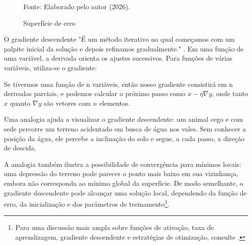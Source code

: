 \begin{figure}[htb]
	\centering
	\captionsetup{justification=centering}
	\caption{Superfície de erro}
	\label{fig:superficie_erro}
	\vspace{5pt}
	
	

	\vspace{0.2cm}
	\footnotesize Fonte: Elaborado pelo autor (2026).
	
\end{figure}

O gradiente descendente "É um método iterativo no qual começamos com um palpite inicial da solução e depois refinamos gradualmente." . Em uma função de uma variável, a derivada orienta os ajustes sucessivos. Para funções de várias variáveis, utiliza-se o gradiente:

\begin{citacao}
	Se tivermos uma função de n variáveis, então nosso gradiente consistirá em n derivadas parciais, e podemos calcular o próximo passo como $x-\eta \nabla y$, onde tanto $x$ quanto $\nabla y$ são vetores com $n$ elementos.  
\end{citacao}

Uma analogia ajuda a visualizar o gradiente descendente: um animal cego e com sede percorre um terreno acidentado em busca de água nos vales. Sem conhecer a posição da água, ele percebe a inclinação do solo e segue, a cada passo, a direção de descida.

A analogia também ilustra a possibilidade de convergência para mínimos locais: uma depressão do terreno pode parecer o ponto mais baixo em sua vizinhança, embora não corresponda ao mínimo global da superfície. De modo semelhante, o gradiente descendente pode alcançar uma solução local, dependendo da função de erro, da inicialização e dos parâmetros de treinamento\footnote{Para uma discussão mais ampla sobre funções de ativação, taxa de aprendizagem, gradiente descendente e estratégias de otimização, consulte .}.

